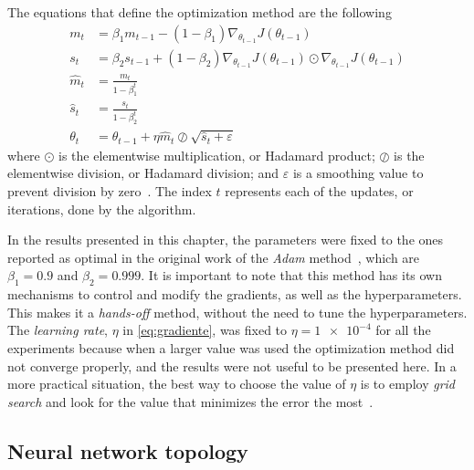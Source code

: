 The equations that define the optimization method are the following
\begin{equation}
    \begin{aligned}
        m_{t} &= \beta_1 m_{t-1} - (1 - \beta_1) \nabla_{\theta_{t-1}} J(\theta_{t-1}) \\
        s_{t} &= \beta_2 s_{t-1} + (1 - \beta_2) \nabla_{\theta_{t-1}} J(\theta_{t-1}) \odot \nabla_{\theta_{t-1}} J(\theta_{t-1}) \\
        \hat{m}_{t} &= \frac{m_{t}}{1 - \beta_1^t} \\
        \hat{s}_{t} &= \frac{s_{t}}{1 - \beta_2^t} \\
        \theta_{t} &= \theta_{t-1} + \eta \hat{m}_{t} \oslash \sqrt{\hat{s}_{t} + \varepsilon}
    \end{aligned}
    \label{eq:adam}
\end{equation}
where $\odot$ is the elementwise multiplication, or Hadamard product;
$\oslash$
is the elementwise division, or Hadamard division;
and $\varepsilon$ is a smoothing value to prevent division by zero~\cite{hornMatrixAnalysis2012}.
The index $t$ represents each of the updates, or iterations, done by the algorithm.

In the results presented in this chapter, the parameters were fixed to the ones reported
as optimal in the original work of the \emph{Adam}
method~\cite{kingmaAdamMethodStochastic2017}, which are
$\beta_1=\num{0.9}$ and $\beta_2=\num{0.999}$. It is important to note that this method
has its own mechanisms to control and modify the gradients, as well as the hyperparameters.
This makes it a \emph{hands-off} method, without the need to tune the hyperparameters.
The \emph{learning rate}, $\eta$ in \autoref{eq:gradiente}, was fixed to
$\eta=\num{1e-4}$ for all the experiments because when a larger value was used the 
optimization method did not converge properly, and the results were not useful to be 
presented here. In a more practical situation, the best
way to choose the value of $\eta$ is to employ \emph{grid search} and look for the value
that minimizes the error the most~\cite{hastieElementsStatisticalLearning2009}.

\subsection{Neural network topology}

